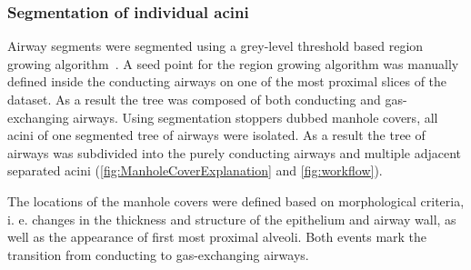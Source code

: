 \documentclass[a4paper,DIV=calc,abstract,english]{scrartcl}
\begin{document}
\subsubsection{Segmentation of individual acini}
\label{sec:manhole covers}
Airway segments were segmented using a grey-level threshold based region growing algorithm~\citep{Zucker1976}.
A seed point for the region growing algorithm was manually defined inside the conducting airways on one of the most proximal slices of the dataset.
As a result the tree was composed of both conducting and gas-exchanging airways.
Using segmentation stoppers dubbed manhole covers, all acini of one segmented tree of airways were isolated.
As a result the tree of airways was subdivided into the purely conducting airways and multiple adjacent separated acini (\autoref{fig:ManholeCoverExplanation} and \ref{fig:workflow}).

The locations of the manhole covers were defined based on morphological criteria, i. e. changes in the thickness and structure of the epithelium and airway wall, as well as the appearance of first most proximal alveoli. Both events mark the transition from conducting to gas-exchanging airways.
\end{document}
